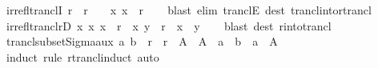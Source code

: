 \begin{isabellebody}
\ irrefl{\isacharunderscore}{\kern0pt}tranclI{\isacharcolon}{\kern0pt}\ {\isachardoublequoteopen}r{\isasyminverse}\ {\isasyminter}\ r\isactrlsup {\isacharasterisk}{\kern0pt}\ {\isacharequal}{\kern0pt}\ {\isacharbraceleft}{\kern0pt}{\isacharbraceright}{\kern0pt}\ {\isasymLongrightarrow}\ {\isacharparenleft}{\kern0pt}x{\isacharcomma}{\kern0pt}\ x{\isacharparenright}{\kern0pt}\ {\isasymnotin}\ r\isactrlsup {\isacharplus}{\kern0pt}{\isachardoublequoteclose}\isanewline
%
\isadelimproof
\ \ %
\endisadelimproof
%
\isatagproof
{}\isamarkupfalse%
\ {\isacharparenleft}{\kern0pt}blast\ elim{\isacharcolon}{\kern0pt}\ tranclE\ dest{\isacharcolon}{\kern0pt}\ trancl{\isacharunderscore}{\kern0pt}into{\isacharunderscore}{\kern0pt}rtrancl{\isacharparenright}{\kern0pt}%
\endisatagproof
{\isafoldproof}%
%
\isadelimproof
\isanewline
%
\endisadelimproof
\isanewline
{}\isamarkupfalse%
\ irrefl{\isacharunderscore}{\kern0pt}trancl{\isacharunderscore}{\kern0pt}rD{\isacharcolon}{\kern0pt}\ {\isachardoublequoteopen}{\isasymforall}x{\isachardot}{\kern0pt}\ {\isacharparenleft}{\kern0pt}x{\isacharcomma}{\kern0pt}\ x{\isacharparenright}{\kern0pt}\ {\isasymnotin}\ r\isactrlsup {\isacharplus}{\kern0pt}\ {\isasymLongrightarrow}\ {\isacharparenleft}{\kern0pt}x{\isacharcomma}{\kern0pt}\ y{\isacharparenright}{\kern0pt}\ {\isasymin}\ r\ {\isasymLongrightarrow}\ x\ {\isasymnoteq}\ y{\isachardoublequoteclose}\isanewline
%
\isadelimproof
\ \ %
\endisadelimproof
%
\isatagproof
{}\isamarkupfalse%
\ {\isacharparenleft}{\kern0pt}blast\ dest{\isacharcolon}{\kern0pt}\ r{\isacharunderscore}{\kern0pt}into{\isacharunderscore}{\kern0pt}trancl{\isacharparenright}{\kern0pt}%
\endisatagproof
{\isafoldproof}%
%
\isadelimproof
\isanewline
%
\endisadelimproof
\isanewline
{}\isamarkupfalse%
\ trancl{\isacharunderscore}{\kern0pt}subset{\isacharunderscore}{\kern0pt}Sigma{\isacharunderscore}{\kern0pt}aux{\isacharcolon}{\kern0pt}\ {\isachardoublequoteopen}{\isacharparenleft}{\kern0pt}a{\isacharcomma}{\kern0pt}\ b{\isacharparenright}{\kern0pt}\ {\isasymin}\ r\isactrlsup {\isacharasterisk}{\kern0pt}\ {\isasymLongrightarrow}\ r\ {\isasymsubseteq}\ A\ {\isasymtimes}\ A\ {\isasymLongrightarrow}\ a\ {\isacharequal}{\kern0pt}\ b\ {\isasymor}\ a\ {\isasymin}\ A{\isachardoublequoteclose}\isanewline
%
\isadelimproof
\ \ %
\endisadelimproof
%
\isatagproof
{}\isamarkupfalse%
\ {\isacharparenleft}{\kern0pt}induct\ rule{\isacharcolon}{\kern0pt}\ rtrancl{\isacharunderscore}{\kern0pt}induct{\isacharparenright}{\kern0pt}\ auto%
\endisatagproof
{\isafoldproof}%
%

\end{isabellebody}
